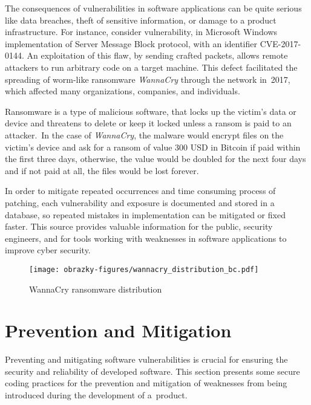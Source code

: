   The consequences of vulnerabilities in software applications can be quite serious like data breaches,
  theft of sensitive information, or damage to a product infrastructure. For instance, consider
  vulnerability, in Microsoft Windows implementation of Server Message Block protocol, with an identifier
  CVE-2017-0144. An exploitation of this flaw, by sending crafted packets, allows remote attackers to run
  arbitrary code on a target machine. This defect facilitated the spreading of worm-like ransomware
  \emph{WannaCry} through the network in~2017, which affected many organizations, companies, and individuals.
  \cite{WannaCry}

  Ransomware is a type of malicious software, that locks up the victim's data or device and threatens to delete
  or keep it locked unless a ransom is paid to an attacker.\,\cite{Malware} In the case of \emph{WannaCry},
  the malware would encrypt files on the victim's device and ask for a ransom of value 300 USD in Bitcoin
  if paid within the first three days, otherwise, the value would be doubled for the next four days and if
  not paid at all, the files would be lost forever.

  In order to mitigate repeated occurrences and time consuming process of patching, each
  vulnerability and exposure is documented and stored in a database, so repeated mistakes in implementation
  can be mitigated or fixed faster. This source provides valuable information for the public,
  security engineers, and for tools working with weaknesses in software applications to improve
  cyber security.

  \newpage

  \begin{figure}[h]
    \centering
    \texttt{[image: obrazky-figures/wannacry\_distribution\_bc.pdf]}
    \caption{WannaCry ransomware distribution}
  \end{figure}

  \section{Prevention and Mitigation}
  Preventing and mitigating software vulnerabilities is crucial for ensuring the security and reliability
  of developed software. This section presents some secure coding practices for the prevention
  and mitigation of weaknesses from being introduced during the development of a~product.


